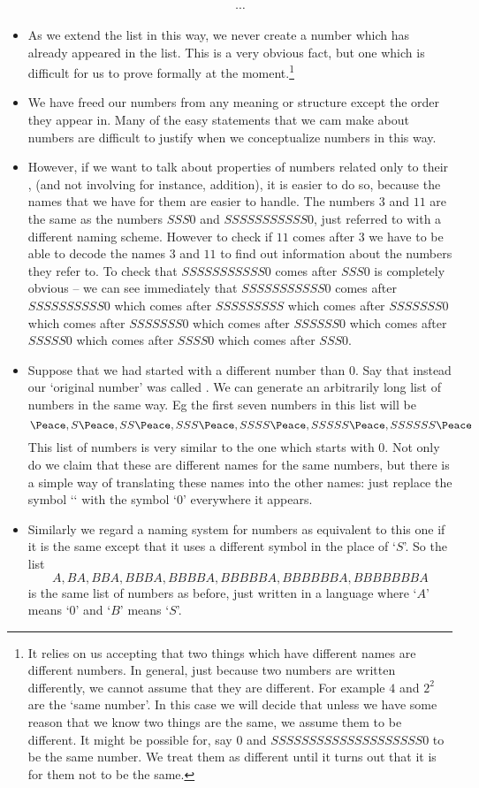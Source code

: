 \begin{itemize}
\begin{align*}
\cdots
\end{align*}
\item
As we extend the list in this way, we never create a number which has already appeared in the list. This is a very obvious fact, but one which is difficult for us to prove formally at the moment.\footnote{It relies on us accepting that two things which have different names are different numbers. In general, just because two numbers are written differently, we cannot assume that they are different. For example $4$ and $2^2$ are the `same number'. In this case we will decide that unless we have some reason that we know two things are the same, we assume them to be different. It might be possible for, say $0$ and $SSSSSSSSSSSSSSSSSSSS0$ to be the same number. We treat them as different until it turns out that it is  for them not to be the same.}
\item
We have freed our numbers from any meaning or structure except the order they appear in. Many of the easy statements that we cam make about numbers are difficult to justify when we conceptualize numbers in this way.
\item
However, if we want to talk about properties of numbers related only to their , (and not involving for instance, addition), it is easier to do so, because the names that we have for them are easier to handle. The numbers $3$ and $11$ are the same as the numbers $SSS0$ and $SSSSSSSSSSS0$, just referred to with a different naming scheme. However to check if $11$ comes after $3$ we have to be able to decode the names $3$ and $11$ to find out information about the numbers they refer to. To check that $SSSSSSSSSSS0$ comes after $SSS0$ is completely obvious -- we can see immediately that $SSSSSSSSSSS0$ comes after $SSSSSSSSSS0$ which comes after $SSSSSSSSS$ which comes after $SSSSSSS0$ which comes after $SSSSSSS0$ which comes after $SSSSSS0$ which comes after $SSSSS0$ which comes after $SSSS0$ which comes after $SSS0$. 
\item
Suppose that we had started with a different number than $0$. Say that instead our `original number' was called {\Peace}. We can generate an arbitrarily long list of numbers in the same way. Eg the first seven numbers in this list will be 
\[ \text{\Peace}, S\text{\Peace}, SS\text{\Peace}, SSS\text{\Peace}, SSSS\text{\Peace}, SSSSS\text{\Peace}, SSSSSS\text{\Peace}  \]
This list of numbers is very similar to the one which starts with $0$. Not only do we claim that these are different names for the same numbers, but there is a simple way of translating these names into the other names: just replace the symbol `\Peace` with the symbol `$0$' everywhere it appears.
\item
Similarly we regard a naming system for numbers as equivalent to this one if it is the same except that it uses a different symbol in the place of `$S$'. So the list 
\[ A, BA, BBA, BBBA, BBBBA, BBBBBA, BBBBBBA, BBBBBBBA \] 
is the same list of numbers as before, just written in a language where `$A$' means `$0$' and `$B$' means `$S$'.
\end{itemize}
